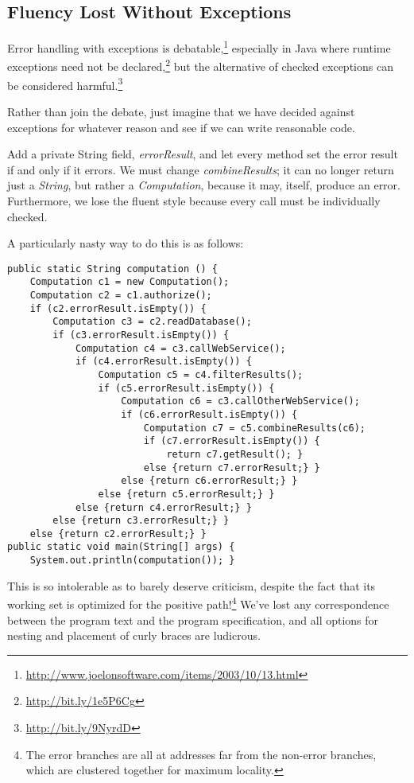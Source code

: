 \documentclass[11pt]{article}
\begin{document}
\subsection{Fluency Lost Without Exceptions}
\label{sec-2-3}

Error handling with exceptions is
debatable,\footnote{\url{http://www.joelonsoftware.com/items/2003/10/13.html}}
especially in Java where runtime exceptions need not be
declared,\footnote{\url{http://bit.ly/1e5P6Cg}} but the alternative of checked
exceptions can be considered harmful.\footnote{\url{http://bit.ly/9NyrdD}}

Rather than join the debate, just imagine that we have decided
against exceptions for whatever reason and see if we can write
reasonable code.

Add a private String field, \emph{errorResult}, and let every method set
the error result if and only if it errors. We must change
\emph{combineResults}; it can no longer return just a \emph{String}, but
rather a \emph{Computation}, because it may, itself, produce an error.
Furthermore, we lose the fluent style because every call must be
individually checked.

A particularly nasty way to do this is as follows:

\begin{verbatim}
public static String computation () {
    Computation c1 = new Computation();
    Computation c2 = c1.authorize();
    if (c2.errorResult.isEmpty()) {
        Computation c3 = c2.readDatabase();
        if (c3.errorResult.isEmpty()) {
            Computation c4 = c3.callWebService();
            if (c4.errorResult.isEmpty()) {
                Computation c5 = c4.filterResults();
                if (c5.errorResult.isEmpty()) {
                    Computation c6 = c3.callOtherWebService();
                    if (c6.errorResult.isEmpty()) {
                        Computation c7 = c5.combineResults(c6);
                        if (c7.errorResult.isEmpty()) {
                            return c7.getResult(); }
                        else {return c7.errorResult;} }
                    else {return c6.errorResult;} }
                else {return c5.errorResult;} }
            else {return c4.errorResult;} }
        else {return c3.errorResult;} }
    else {return c2.errorResult;} }
public static void main(String[] args) {
    System.out.println(computation()); }
\end{verbatim}

This is so intolerable as to barely deserve criticism, despite the
fact that its working set is optimized for the positive
path!\footnote{The error branches are all at addresses far from the
   non-error branches, which are clustered together for  maximum locality.} We've
lost any correspondence between the program text and the program
specification, and all options for nesting and placement of curly
braces are ludicrous.
\end{document}
